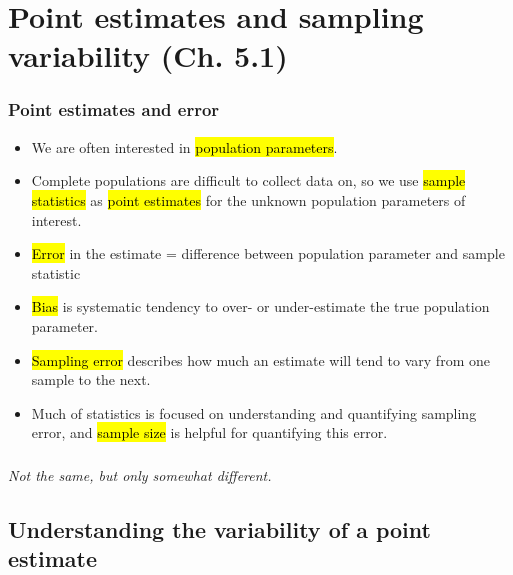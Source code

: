 \documentclass[t,compress,mathserif]{beamer}
\newcommand{\soln}[1]{\textit{#1}}
\begin{document}
\section{Point estimates and sampling variability (Ch. 5.1)}


\begin{frame}
    \frametitle{Point estimates and error}

    \begin{itemize}

        \item We are often interested in \hl{population parameters}.
        \item Complete populations are difficult to collect data on, so we use \hl{sample statistics} as \hl{point estimates} for the unknown population parameters of interest.
        \item \hl{Error} in the estimate = difference between population parameter and sample statistic
        \item \hl{Bias} is systematic tendency to over- or under-estimate the true population parameter.
        \item \hl{Sampling error} describes how much an estimate will tend to vary from one sample to the next.
        \item Much of statistics is focused on understanding and quantifying sampling error, and \hl{sample size} is helpful for quantifying this error.

    \end{itemize}

\end{frame}



\begin{frame}
    \frametitle{}
    
    
    \pause
    
    \soln{Not the same, but only somewhat different.}
    
\end{frame}


\subsection{Understanding the variability of a point estimate}
\end{document}
